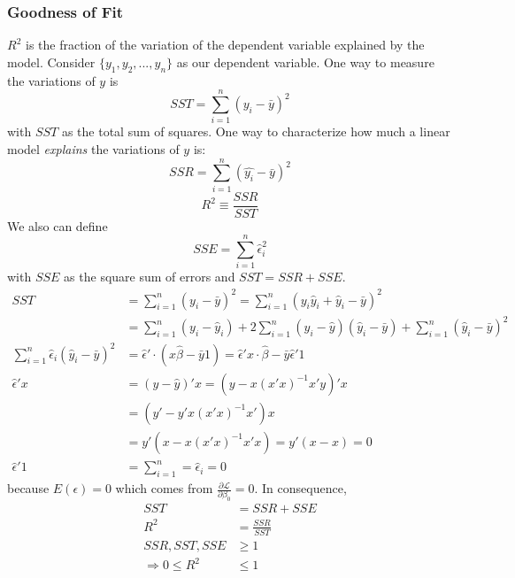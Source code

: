 	\subsubsection{Goodness of Fit}
			$R^2$ is the fraction of the variation of the dependent variable explained by the model. Consider $\{y_1,y_2,...,y_n\}$ as our dependent variable. One way to measure the variations of $y$ is
			\begin{equation*}
				SST=\sum\limits_{i=1}^n(y_i-\bar{y})^2
			\end{equation*}
			with $SST$ as the total sum of squares. One way to characterize how much a linear model \emph{explains} the variations of $y$ is:
			\begin{equation*}
				SSR=\sum\limits_{i=1}^n(\hat{y_i}-\bar{y})^2
			\end{equation*}
			\begin{equation*}
				R^2\equiv\frac{SSR}{SST}
			\end{equation*}
			We also can define
			\begin{equation*}
				SSE=\sum\limits_{i=1}^n \hat{\epsilon}^2_i
			\end{equation*}
			with $SSE$ as the square sum of errors and $SST=SSR+SSE$.
			\begin{align*}
				SST&=\sum\limits_{i=1}^n (y_i-\bar{y})^2=\sum\limits_{i=1}^n (y_i\hat{y}_i+\hat{y}_i-\bar{y})^2\\
				&=\sum\limits_{i=1}^n (y_i-\hat{y}_i)+2\sum\limits_{i=1}^n (y_i-\hat{y})(\hat{y}_i-\bar{y})+\sum\limits_{i=1}^n (\hat{y}_i-\bar{y})^2\\
				\sum\limits_{i=1}^n \hat{\epsilon}_i(\hat{y}_i-\bar{y})^2&=\hat{\epsilon}'\cdot(x\hat{\beta}-\bar{y}1)=\hat{\epsilon}' x\cdot \hat{\beta}-\bar{y}\hat{\epsilon}'1\\
				\hat{\epsilon}'x&=(y-\hat{y})'x=(y-x(x'x)^{-1}x'y)'x\\
				&=(y'-y'x(x'x)^{-1}x')x\\
				&=y'(x-x(x'x)^{-1}x'x)=y'(x-x)=0\\
				\hat{\epsilon}'1&=\sum\limits_{i=1}^n=\hat{\epsilon}_i=0
			\end{align*}
			because $E(\epsilon)=0$ which comes from $\frac{\partial \mathcal{L}}{\partial\beta_0}=0$.
			In consequence,
			\begin{align*}
				SST&=SSR+SSE\\
				R^2&=\frac{SSR}{SST}\\
				SSR,SST,SSE&\geq 1\\
				\Longrightarrow 0\leq R^2 &\leq 1
			\end{align*}
